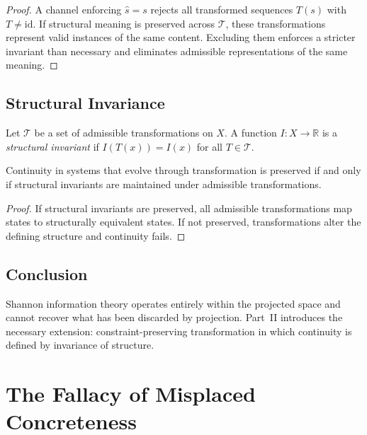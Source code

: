 \documentclass[11pt,openany]{book}
\begin{document}
\begin{proof}
A channel enforcing $\hat{s} = s$ rejects all transformed
sequences $T(s)$ with $T \neq \mathrm{id}$. If structural
meaning is preserved across $\mathcal{T}$, these
transformations represent valid instances of the same
content. Excluding them enforces a stricter invariant than
necessary and eliminates admissible representations of the
same meaning.
\end{proof}

\section{Structural Invariance}
\label{sec:structural-invariance}

\begin{definition}
Let $\mathcal{T}$ be a set of admissible transformations on
$X$. A function $I : X \to \mathbb{R}$ is a
\emph{structural invariant} if $I(T(x)) = I(x)$ for all
$T \in \mathcal{T}$.
\end{definition}

\begin{proposition}
Continuity in systems that evolve through transformation is
preserved if and only if structural invariants are
maintained under admissible transformations.
\end{proposition}

\begin{proof}
If structural invariants are preserved, all admissible
transformations map states to structurally equivalent states.
If not preserved, transformations alter the defining
structure and continuity fails.
\end{proof}

\section{Conclusion}
\label{sec:conclusion-information}

Shannon information theory operates entirely within the
projected space and cannot recover what has been discarded
by projection. Part~II introduces the necessary extension:
constraint-preserving transformation in which continuity is
defined by invariance of structure.


\chapter{The Fallacy of Misplaced Concreteness}
\label{ch:misplaced-concreteness}
\end{document}
